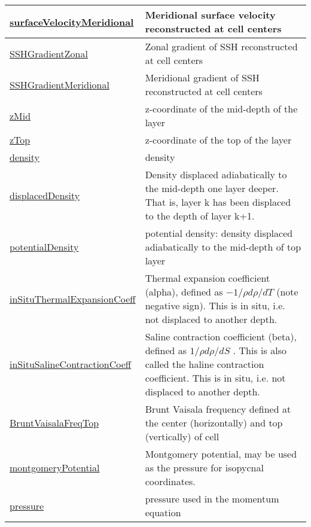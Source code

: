 {\begin{center}
\begin{longtable}{| p{2.0in} | p{4.0in} |}
    \hline
    \hyperref[subsec:var_sec_diagnostics_surfaceVelocityMeridional]{surfaceVelocityMeridional} & Meridional surface velocity reconstructed at cell centers \\
    \hline
    \hyperref[subsec:var_sec_diagnostics_SSHGradientZonal]{SSHGradientZonal} & Zonal gradient of SSH reconstructed at cell centers \\
    \hline
    \hyperref[subsec:var_sec_diagnostics_SSHGradientMeridional]{SSHGradientMeridional} & Meridional gradient of SSH reconstructed at cell centers \\
    \hline
    \hyperref[subsec:var_sec_diagnostics_zMid]{zMid} & z-coordinate of the mid-depth of the layer \\
    \hline
    \hyperref[subsec:var_sec_diagnostics_zTop]{zTop} & z-coordinate of the top of the layer \\
    \hline
    \hyperref[subsec:var_sec_diagnostics_density]{density} & density \\
    \hline
    \hyperref[subsec:var_sec_diagnostics_displacedDensity]{displacedDensity} & Density displaced adiabatically to the mid-depth one layer deeper.  That is, layer k has been displaced to the depth of layer k+1. \\
    \hline
    \hyperref[subsec:var_sec_diagnostics_potentialDensity]{potentialDensity} & potential density: density displaced adiabatically to the mid-depth of top layer \\
    \hline
    \hyperref[subsec:var_sec_diagnostics_inSituThermalExpansionCoeff]{inSituThermalExpansionCoeff} &  Thermal expansion coefficient (alpha), defined as  $-1/\rho d\rho/dT$  (note negative sign).  This is in situ, i.e. not displaced to another depth. \\
    \hline
    \hyperref[subsec:var_sec_diagnostics_inSituSalineContractionCoeff]{inSituSalineContractionCoeff} &  Saline contraction coefficient (beta), defined as  $1/\rho d\rho/dS$ .  This is also called the haline contraction coefficient.  This is in situ, i.e. not displaced to another depth. \\
    \hline
    \hyperref[subsec:var_sec_diagnostics_BruntVaisalaFreqTop]{BruntVaisalaFreqTop} & Brunt Vaisala frequency defined at the center (horizontally) and top (vertically) of cell \\
    \hline
    \hyperref[subsec:var_sec_diagnostics_montgomeryPotential]{montgomeryPotential} & Montgomery potential, may be used as the pressure for isopycnal coordinates. \\
    \hline
    \hyperref[subsec:var_sec_diagnostics_pressure]{pressure} & pressure used in the momentum equation \\

\end{longtable}
\end{center}}
